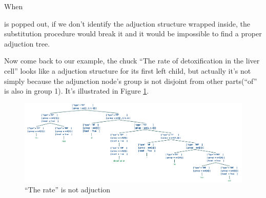 \documentclass[a4paper]{article}
\begin{document}
\begin{center}
\end{center}
When 
\begin{center}
\end{center}
is popped out, if we don't identify the adjuction structure wrapped inside, the substitution procedure would break it and it would be impossible to find a proper adjuction tree.

Now come back to our example, the chuck ``The rate of detoxification in the liver cell'' looks like a adjuction structure for its first left child, but actually it's not simply because the adjunction node's group is not disjoint from other parts(``of'' is also in group 1). It's illustrated in Figure \ref{fig:no-adjunct}.

\begin{figure}[h]
    \begin{center}
        \includegraphics[scale=0.4]{noadj.png}
    \end{center}
    \caption{``The rate'' is not adjuction}
    \label{fig:no-adjunct}
\end{figure}
\end{document}
